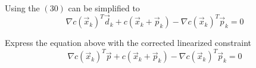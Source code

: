 \documentclass[a4paper,10pt]{article}
\begin{document}
\begin{enumerate}
{        Using the $(30)$ can be simplified to
        \[
            \nabla c\left(\vec{x}_{k}\right)^{T} \vec{d}_{k}+c\left(\vec{x}_{k}+\vec{p}_{k}\right)-\nabla c\left(\vec{x}_{k}\right)^{T} \vec{p}_{k}=0
        \]

        Express the equation above with the corrected linearized constraint
        \[
            \nabla c\left(\vec{x}_{k}\right)^{T} \vec{p}+c\left(\vec{x}_{k}+\vec{p}_{k}\right)-\nabla c\left(\vec{x}_{k}\right)^{T} \vec{p}_{k}=0
        \]
    }

\end{enumerate}
\end{document}
